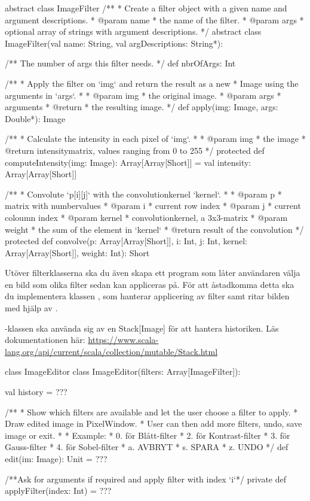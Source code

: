 \begin{ScalaSpec}{abstract class ImageFilter}
	/**
	* Create a filter object with a given name and argument descriptions.
	* @param name
	*            the name of the filter.
	* @param args
	*            optional array of strings with argument descriptions.
	*/
	abstract class ImageFilter(val name: String, val argDescriptions: String*):

		/**
		The number of args this filter needs.
		*/
		def nbrOfArgs: Int

		/**
		* Apply the filter on `img` and return the result as a new 
		* Image using the arguments in `args`.
		* 
		* @param img
		*            the original image.
		* @param args
		*            arguments
		* @return 
		*			 the resulting image.
		*/
		def apply(img: Image, args: Double*): Image

		/**
		* Calculate the intensity in each pixel of `img`.
		* 
		* @param img
		*           the image
		* @return intensitymatrix, values ranging from 0 to 255
		*/
		protected def computeIntensity(img: Image): Array[Array[Short]] = 
		   val intensity: Array[Array[Short]]

		/**
		* Convolute `p[i][j]` with the convolutionkernel `kernel`.
		* 
		* @param p
		*            matrix with numbervalues
		* @param i
		*            current row index
		* @param j
		*            current coloumn index
		* @param kernel
		*            convolutionkernel, a 3x3-matrix
		* @param weight
		*            the sum of the element in `kernel`
		* @return result of the convolution
		*/
		protected def convolve(p: Array[Array[Short]], i: Int, j: Int, 
		kernel: Array[Array[Short]], weight: Int): Short

\end{ScalaSpec}

Utöver filterklasserna ska du även skapa ett program som låter användaren välja en bild som olika filter sedan kan appliceras på.
För att åstadkomma detta ska du implementera klassen , som hanterar applicering av filter samt ritar bilden med hjälp av .



-klassen ska använda sig av en Stack[Image] för att hantera historiken. 
Läs dokumentationen här: \url{https://www.scala-lang.org/api/current/scala/collection/mutable/Stack.html}

\begin{ScalaSpec}{class ImageEditor}
	class ImageEditor(filters: Array[ImageFilter]):

		val history = ???

		/** 
		 * Show which filters are available and let the user choose a filter to apply. 
		 * Draw edited image in PixelWindow.
		 * User can then add more filters, undo, save image or exit.
		 *  
		 *  Example: 
		 *  0. för Blått-filter
		 *	2. för Kontrast-filter
		 * 	3. för Gauss-filter
		 *	4. för Sobel-filter
		 *	a. AVBRYT
		 *	s. SPARA
		 *	z. UNDO
		*/
		def edit(im: Image): Unit = ???

		/**Ask for arguments if required and apply filter with index `i`*/
		private def applyFilter(index: Int) = ???
\end{ScalaSpec}

